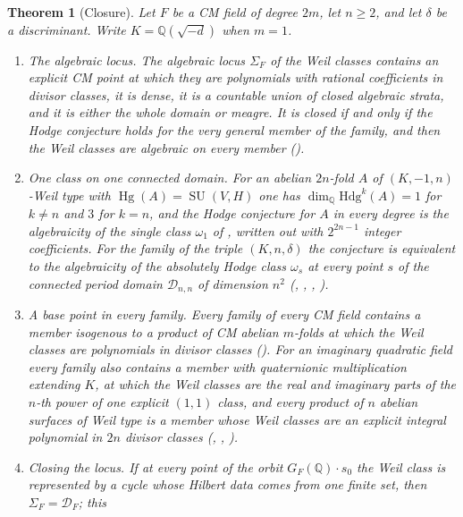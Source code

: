 \documentclass[11pt,reqno]{amsart}
\theoremstyle{plain}
\newtheorem{theorem}{Theorem}[section]
\theoremstyle{definition}
\theoremstyle{remark}
\newcommand{\QQ}{\mathbb{Q}}
\newcommand{\cD}{\mathcal{D}}
\newcommand{\Hdg}{\mathrm{Hdg}}
\DeclareMathOperator{\Hg}{Hg}
\DeclareMathOperator{\SU}{SU}
\begin{document}
\begin{theorem}[Closure]\label{thm:final}
Let $F$ be a CM field of degree $2m$, let $n\ge2$, and let $\delta$ be a
discriminant. Write $K=\QQ(\sqrt{-d})$ when $m=1$.
\begin{enumerate}[label=\textup{(\roman*)},leftmargin=2.8em,itemsep=4pt]
\item \emph{The algebraic locus.} The algebraic locus $\Sigma_{F}$ of the Weil
  classes contains an explicit CM point at which they are polynomials with
  rational coefficients in divisor classes, it is dense, it is a countable
  union of closed algebraic strata, and it is either the whole domain or
  meagre. It is closed if and only if the Hodge conjecture holds for the very
  general member of the family, and then the Weil classes are algebraic on
  every member (\cite[Theorem~1.1]{paperI}).
\item \emph{One class on one connected domain.} For an abelian $2n$-fold $A$ of
  $(K,-1,n)$-Weil type with $\Hg(A)=\SU(V,H)$ one has
  $\dim_{\QQ}\Hdg^{k}(A)=1$ for $k\ne n$ and $3$ for $k=n$, and the Hodge
  conjecture for $A$ in every degree is the algebraicity of the single class
  $\omega_{1}$ of \cite[(11)]{paperI}, written out with $2^{2n-1}$ integer
  coefficients. For the family of the triple $(K,n,\delta)$ the conjecture is
  equivalent to the algebraicity of the absolutely Hodge class $\omega_{s}$ at
  every point $s$ of the connected period domain $\cD_{n,n}$ of dimension
  $n^{2}$ (\cite[Theorem~4.14]{paperI}, \cite[Corollary~4.15]{paperI}, \cite[Theorem~15.14]{paperI},
  \cite[Corollary~15.35]{paperI}).
\item \emph{A base point in every family.} Every family of every CM field
  contains a member isogenous to a product of CM abelian $m$-folds at which
  the Weil classes are polynomials in divisor classes
  (\cite[Theorem~17.5]{paperI}). For an imaginary quadratic field every family also
  contains a member with quaternionic multiplication extending $K$, at which
  the Weil classes are the real and imaginary parts of the $n$-th power of one
  explicit $(1,1)$ class, and every product of $n$ abelian surfaces of Weil
  type is a member whose Weil classes are an explicit integral polynomial in
  $2n$ divisor classes (\cite[Theorem~15.25]{paperI}, \cite[Theorem~15.27]{paperI},
  \cite[Theorem~15.10]{paperI}).
\item \emph{Closing the locus.} If at every point of the orbit
  $G_{F}(\QQ)\cdot s_{0}$ the Weil class is represented by a cycle whose
  Hilbert data comes from one finite set, then $\Sigma_{F}=\cD_{F}$; this

\end{enumerate}
\end{theorem}
\end{document}
